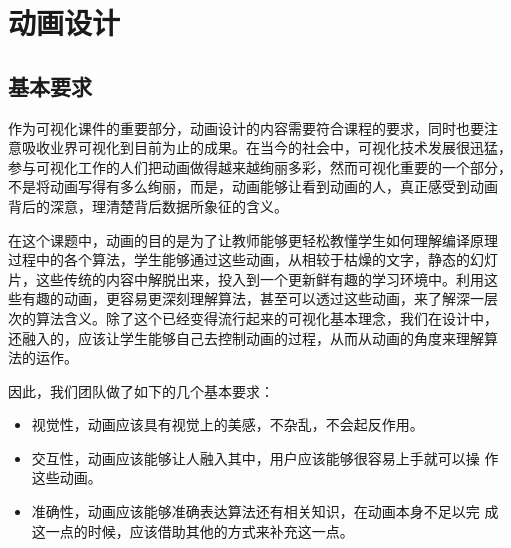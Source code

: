 \section{动画设计}
\subsection{基本要求}
作为可视化课件的重要部分，动画设计的内容需要符合课程的要求，同时也要注
意吸收业界可视化到目前为止的成果。在当今的社会中，可视化技术发展很迅猛，
参与可视化工作的人们把动画做得越来越绚丽多彩，然而可视化重要的一个部分，
不是将动画写得有多么绚丽，而是，动画能够让看到动画的人，真正感受到动画
背后的深意，理清楚背后数据所象征的含义。

在这个课题中，动画的目的是为了让教师能够更轻松教懂学生如何理解编译原理
过程中的各个算法，学生能够通过这些动画，从相较于枯燥的文字，静态的幻灯
片，这些传统的内容中解脱出来，投入到一个更新鲜有趣的学习环境中。利用这
些有趣的动画，更容易更深刻理解算法，甚至可以透过这些动画，来了解深一层
次的算法含义。除了这个已经变得流行起来的可视化基本理念，我们在设计中，
还融入的，应该让学生能够自己去控制动画的过程，从而从动画的角度来理解算
法的运作。

因此，我们团队做了如下的几个基本要求：
\begin{itemize}
\item 视觉性，动画应该具有视觉上的美感，不杂乱，不会起反作用。
\item 交互性，动画应该能够让人融入其中，用户应该能够很容易上手就可以操
  作这些动画。
\item 准确性，动画应该能够准确表达算法还有相关知识，在动画本身不足以完
  成这一点的时候，应该借助其他的方式来补充这一点。
\end{itemize}
